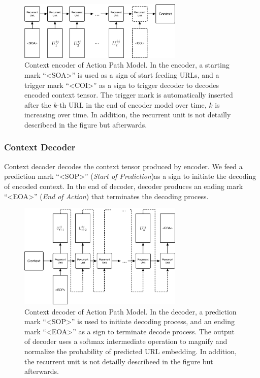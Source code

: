\begin{figure}[H]
    \centering
    \includegraphics[width=0.7\textwidth]{figures/encoder}
    \caption{Context encoder of Action Path Model. In the encoder, 
    a starting mark ``<SOA>'' is used as a sign of start feeding URLs, 
    and a trigger mark ``<COI>'' as
    a sign to trigger decoder to decodes encoded context tensor.
    The trigger mark is automatically inserted after the $k$-th URL in the end
    of encoder model over time, $k$ is increasing over time.
    In addition, the recurrent unit is not detailly describeed in the figure but afterwards.}
    \label{fig:encoder}
\end{figure}

\subsubsection{Context Decoder}

Context decoder decodes the context tensor produced by encoder. We feed a prediction mark
``<SOP>'' (\emph{Start of Prediction})as a sign to initiate the decoding of encoded context.
In the end of decoder, decoder produces an ending mark ``<EOA>'' (\emph{End of Action}) that
terminates the decoding process.

\begin{figure}[H]
    \centering
    \includegraphics[width=0.7\textwidth]{figures/decoder}
    \caption{Context decoder of Action Path Model. In the decoder, 
    a prediction mark ``<SOP>'' is used to initiate decoding process, 
    and an ending mark ``<EOA>'' as a sign to terminate decode process.
    The output of decoder uses a softmax intermediate operation to magnify and normalize
    the probability of predicted URL embedding.
    In addition, the recurrent unit is not detailly describeed in the figure but afterwards.}
    \label{fig:decoder}
\end{figure}

